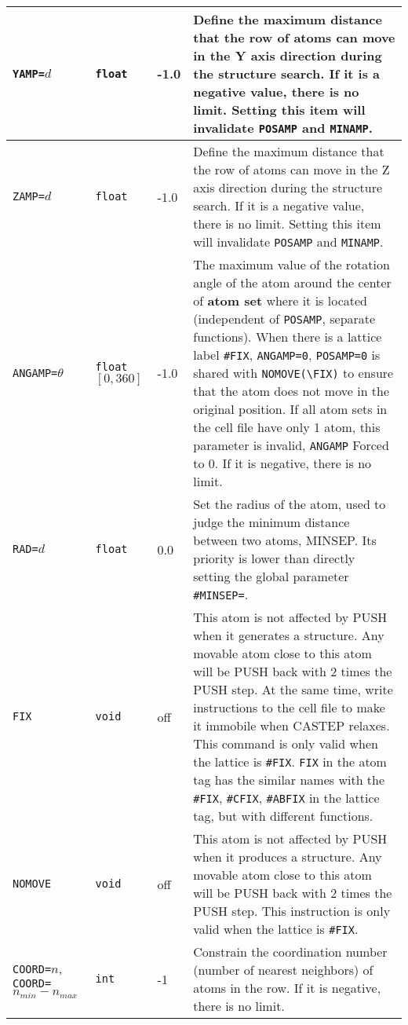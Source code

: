 \documentclass[a4paper, 10pt]{article}
\begin{document}
\begin{center}
\begin{longtable}{m{10em}|m{4em}<{\centering}|m{3em}<{\centering}|m{15em}}
\midrule
\verb|YAMP=|\(d\)& \verb|float| & -1.0 & Define the maximum distance that the row of atoms can move in the Y axis direction during the structure search. If it is a negative value, there is no limit. Setting this item will invalidate \verb|POSAMP| and \verb|MINAMP|.\\
\midrule
\verb|ZAMP=|\(d\)& \verb|float| & -1.0 & Define the maximum distance that the row of atoms can move in the Z axis direction during the structure search. If it is a negative value, there is no limit. Setting this item will invalidate \verb|POSAMP| and \verb|MINAMP|.\\
\midrule
\verb|ANGAMP=|\(\theta\)  & \verb|float| \([0,360]\) & -1.0 & The maximum value of the rotation angle of the atom around the center of \textbf{atom set} where it is located (independent of \verb|POSAMP|, separate functions). When there is a lattice label \verb|#FIX|, \verb|ANGAMP=0|, \verb|POSAMP=0| is shared with \verb|NOMOVE(\FIX)| to ensure that the atom does not move in the original position. If all atom sets in the cell file have only 1 atom, this parameter is invalid, \verb|ANGAMP| Forced to 0. If it is negative, there is no limit.\\
\midrule
\verb|RAD=|\(d\) & \verb|float| & 0.0 & Set the radius of the atom, used to judge the minimum distance between two atoms, MINSEP. Its priority is lower than directly setting the global parameter \verb|#MINSEP=|.\\
\midrule
\verb|FIX| & \verb|void| & off & This atom is not affected by PUSH when it generates a structure. Any movable atom close to this atom will be PUSH back with 2 times the PUSH step. At the same time, write instructions to the cell file to make it immobile when CASTEP relaxes. This command is only valid when the lattice is \verb|#FIX|. \verb|FIX| in the atom tag has the similar names with the \verb|#FIX|, \verb|#CFIX|, \verb|#ABFIX| in the lattice tag, but with different functions. \\
\midrule
\verb|NOMOVE| & \verb|void| & off & This atom is not affected by PUSH when it produces a structure. Any movable atom close to this atom will be PUSH back with 2 times the PUSH step. This instruction is only valid when the lattice is \verb|#FIX|.\\
\midrule
\verb|COORD=|\(n\),\hspace{5em} \verb|COORD=|\(n_{min}-n_{max}\) & \verb|int| & -1 & Constrain the coordination number (number of nearest neighbors) of atoms in the row. If it is negative, there is no limit.\\

\end{longtable}
\end{center}
\end{document}
